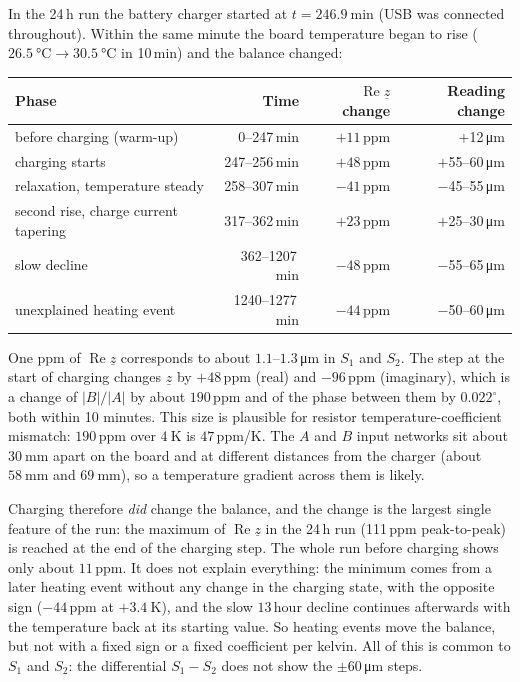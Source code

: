 \documentclass[11pt,a4paper]{article}
\begin{document}
In the 24\,h run the battery charger started at $t=\SI{246.9}{\minute}$
(USB was connected throughout).  Within the same minute the board
temperature began to rise ($\SI{26.5}{\celsius}\to\SI{30.5}{\celsius}$ in
10\,min) and the balance changed:
\begin{center}
\small
\begin{tabular}{@{}lrrr@{}}
\toprule
Phase & Time & $\operatorname{Re}\underline{z}$ change & Reading change \\
\midrule
before charging (warm-up) & 0--247\,min   & $+11$\,ppm & $+$12\,\si{\micro\metre} \\
charging starts           & 247--256\,min & $+48$\,ppm & $+$55--60\,\si{\micro\metre} \\
relaxation, temperature steady & 258--307\,min & $-41$\,ppm & $-$45--55\,\si{\micro\metre} \\
second rise, charge current tapering & 317--362\,min & $+23$\,ppm & $+$25--30\,\si{\micro\metre} \\
slow decline           & 362--1207\,min  & $-48$\,ppm & $-$55--65\,\si{\micro\metre} \\
unexplained heating event & 1240--1277\,min & $-44$\,ppm & $-$50--60\,\si{\micro\metre} \\
\bottomrule
\end{tabular}
\end{center}
One ppm of $\operatorname{Re}\underline{z}$ corresponds to about
$1.1$--$1.3$\,\si{\micro\metre} in $S_1$ and $S_2$.  The step at the start of
charging changes $\underline{z}$ by $+48$\,ppm (real) and $-96$\,ppm
(imaginary), which is a change of $|B|/|A|$ by about $190$\,ppm and of the
phase between them by $0.022^{\circ}$, both within 10 minutes.  This size is
plausible for resistor temperature-coefficient mismatch: $190$\,ppm over
$\SI{4}{\kelvin}$ is $47$\,ppm/K.  The $A$ and $B$ input networks sit about
$\SI{30}{\milli\metre}$ apart on the board and at different distances from the
charger (about $\SI{58}{\milli\metre}$ and $\SI{69}{\milli\metre}$), so a
temperature gradient across them is likely.

Charging therefore \emph{did} change the balance, and the change is the
largest single feature of the run: the maximum of $\operatorname{Re}\underline{z}$
in the 24\,h run (111\,ppm peak-to-peak) is reached at the end of the charging
step.  The whole run before charging shows only about $11$\,ppm.  It does not
explain everything: the minimum comes from a later heating event without any
change in the charging state, with the opposite sign ($-44$\,ppm at
$+\SI{3.4}{\kelvin}$), and the slow $13$\,hour decline continues afterwards
with the temperature back at its starting value.  So heating events move the
balance, but not with a fixed sign or a fixed coefficient per kelvin.
All of this is common to $S_1$ and $S_2$: the differential
$S_1-S_2$ does not show the $\pm 60$\,\si{\micro\metre} steps.
\end{document}
